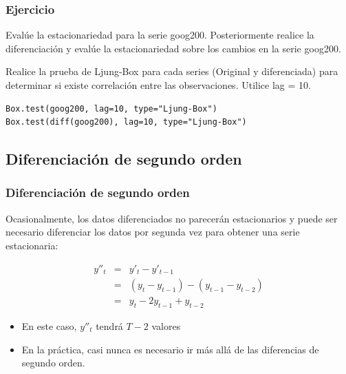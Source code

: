 \documentclass[10pt]{beamer}
\begin{document}



\begin{frame}[fragile]
\frametitle{Ejercicio}


Evalúe la estacionariedad para la serie goog200. Posteriormente realice la diferenciación y evalúe la estacionariedad sobre los cambios en la serie goog200.

\vspace{4mm}

Realice la prueba de Ljung-Box para cada series (Original y diferenciada) para determinar si existe correlación entre las observaciones. Utilice lag = 10.


\begin{center}
\end{center}

\pause

\lstset{language=r,label= ,caption= ,captionpos=b,numbers=none}
\begin{lstlisting}
Box.test(goog200, lag=10, type="Ljung-Box")
Box.test(diff(goog200), lag=10, type="Ljung-Box")
\end{lstlisting}




\end{frame}






\subsection{Diferenciación de segundo orden}

\begin{frame}[fragile]
\frametitle{Diferenciación de segundo orden}


Ocasionalmente, los datos diferenciados no parecerán estacionarios y puede ser necesario diferenciar los datos por segunda vez para obtener una serie estacionaria:


\begin{eqnarray}
y''_t & = & y'_t - y'_{t-1} \\
      & = & (y_t - y_{t-1}) - (y_{t-1} - y_{t-2}) \\
      & = & y_t - 2y_{t-1} +  y_{t-2}
\end{eqnarray}

\vspace{4mm}

\begin{itemize}
\item En este caso, $y''_t$ tendrá $T-2$ valores
\item En la práctica, casi nunca es necesario ir más allá de las diferencias de segundo orden.
\end{itemize}



\end{frame}
\end{document}
